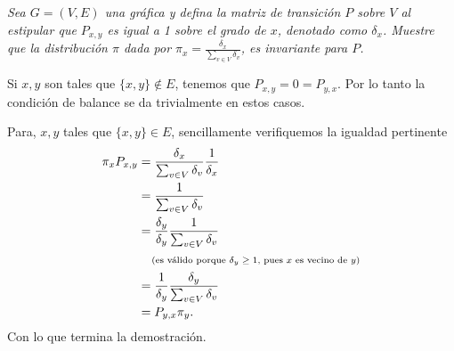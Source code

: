 \emph{
    Sea $G=(V,E)$ una gráfica y defina la matriz de transición $P$ sobre $V$ al estipular que
    $P_{x,y}$ es igual a 1 sobre el grado de $x$, denotado como $\delta_x$. Muestre que la distribución $\pi$
    dada por $\pi_x = \frac{\delta_x}{\sum_{v \in V} \delta_v}$, es invariante para $P$.
}

\afterstatement\pn

Si $x,y$ son tales que $\{x,y\} \not\in E$, tenemos que $P_{x,y} = 0 = P_{y,x}$. Por lo tanto
la condición de balance se da trivialmente en estos casos.\pn

Para, $x,y$ tales que $\{x, y\} \in E$, sencillamente verifiquemos la igualdad pertinente
\begin{align}
        \pi_x P_{x,y}   &=  \frac{\delta_x}{\sum_{v \in V} \delta_v} \frac{1}{\delta_x}          \\
                        &=  \frac{1}{\sum_{v \in V} \delta_v}                                    \\
                        &=  \frac{\delta_y}{\delta_y} \frac{1}{\sum_{v \in V} \delta_v}          \\
                        &\;\;\;\;\mbox{{\scriptsize(es válido porque $\delta_y \geq 1$, pues $x$ es vecino de $y$)}}\\
                        &=  \frac{1}{\delta_y} \frac{\delta_y}{\sum_{v \in V} \delta_v}          \\
                        &=  P_{y,x} \pi_y.
\end{align}
Con lo que termina la demostración.